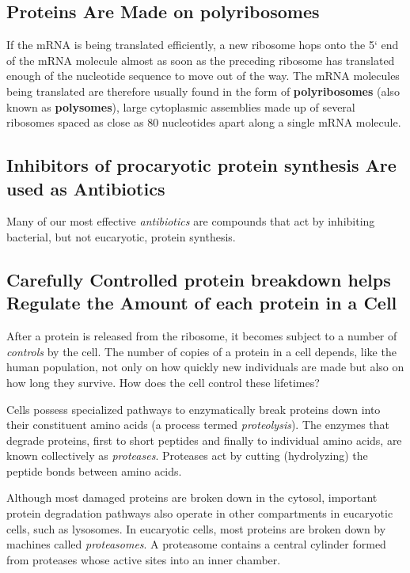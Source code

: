 \subsection{Proteins Are Made on polyribosomes}

If the mRNA is being translated efficiently, a new ribosome hops onto the 5`
end of the mRNA molecule almost as soon as the preceding ribosome has
translated enough of the nucleotide sequence to move out of the way.
The mRNA molecules being translated are therefore usually found in
the form of \textbf{polyribosomes} (also known as \textbf{polysomes}), large cytoplasmic
assemblies made up of several ribosomes spaced as close as 80 nucleotides
apart along a single mRNA molecule.

\subsection{Inhibitors of procaryotic protein synthesis Are used as Antibiotics}

Many of our most effective \textit{antibiotics} are compounds that act by inhibiting
bacterial, but not eucaryotic, protein synthesis.

\subsection{Carefully Controlled protein breakdown helps Regulate the Amount of each protein in a Cell}

After a protein is released from the ribosome, it becomes subject to a
number of \textit{controls} by the cell. The number of copies of a protein in a cell
depends, like the human population, not only on how quickly new individuals
are made but also on how long they survive. How does the cell control these lifetimes?

Cells possess specialized pathways to enzymatically break proteins
down into their constituent amino acids (a process termed \textit{proteolysis}).
The enzymes that degrade proteins, first to short peptides and finally to
individual amino acids, are known collectively as \textit{proteases}. Proteases
act by cutting (hydrolyzing) the peptide bonds between amino acids.

Although most damaged proteins are broken down in the cytosol,
important protein degradation pathways also operate in other compartments
in eucaryotic cells, such as lysosomes.
In eucaryotic cells, most proteins are broken down by machines called
\textit{proteasomes}. A proteasome contains a central cylinder formed from
proteases whose active sites into an inner chamber.


